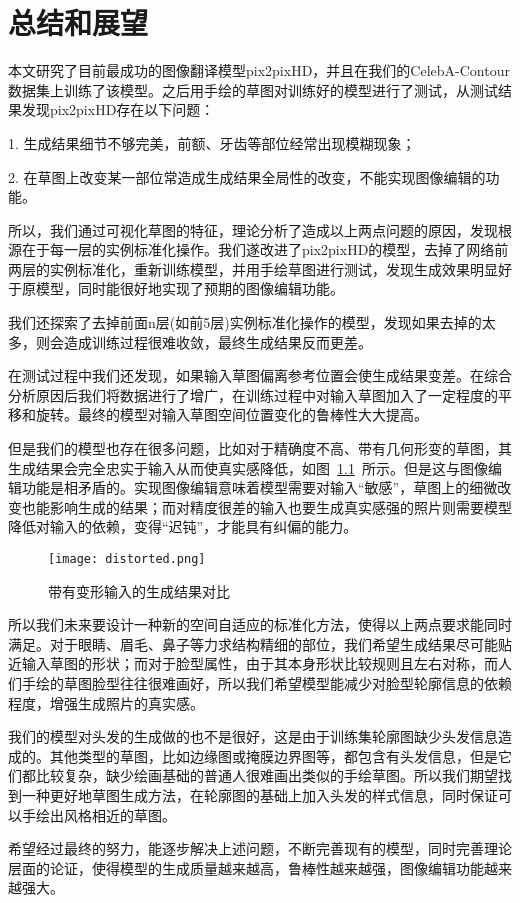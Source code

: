 
\chapter{总结和展望}

本文研究了目前最成功的图像翻译模型pix2pixHD\cite{pix2pixhd}，并且在我们的CelebA-Contour数据集上训练了该模型。之后用手绘的草图对训练好的模型进行了测试，从测试结果发现pix2pixHD存在以下问题：

1. 生成结果细节不够完美，前额、牙齿等部位经常出现模糊现象；

2. 在草图上改变某一部位常造成生成结果全局性的改变，不能实现图像编辑的功能。

所以，我们通过可视化草图的特征，理论分析了造成以上两点问题的原因，发现根源在于每一层的实例标准化操作。我们遂改进了pix2pixHD的模型，去掉了网络前两层的实例标准化，重新训练模型，并用手绘草图进行测试，发现生成效果明显好于原模型，同时能很好地实现了预期的图像编辑功能。

我们还探索了去掉前面n层(如前5层)实例标准化操作的模型，发现如果去掉的太多，则会造成训练过程很难收敛，最终生成结果反而更差。

在测试过程中我们还发现，如果输入草图偏离参考位置会使生成结果变差。在综合分析原因后我们将数据进行了增广，在训练过程中对输入草图加入了一定程度的平移和旋转。最终的模型对输入草图空间位置变化的鲁棒性大大提高。

但是我们的模型也存在很多问题，比如对于精确度不高、带有几何形变的草图，其生成结果会完全忠实于输入从而使真实感降低，如图~\ref{fig:distorted}~所示。但是这与图像编辑功能是相矛盾的。实现图像编辑意味着模型需要对输入“敏感”，草图上的细微改变也能影响生成的结果；而对精度很差的输入也要生成真实感强的照片则需要模型降低对输入的依赖，变得“迟钝”，才能具有纠偏的能力。
\begin{figure}[htb]
	\centering
	\texttt{[image: distorted.png]}
	\caption{带有变形输入的生成结果对比}
	\label{fig:distorted}
\end{figure}

所以我们未来要设计一种新的空间自适应的标准化方法，使得以上两点要求能同时满足。对于眼睛、眉毛、鼻子等力求结构精细的部位，我们希望生成结果尽可能贴近输入草图的形状；而对于脸型属性，由于其本身形状比较规则且左右对称，而人们手绘的草图脸型往往很难画好，所以我们希望模型能减少对脸型轮廓信息的依赖程度，增强生成照片的真实感。

我们的模型对头发的生成做的也不是很好，这是由于训练集轮廓图缺少头发信息造成的。其他类型的草图，比如边缘图或掩膜边界图等，都包含有头发信息，但是它们都比较复杂，缺少绘画基础的普通人很难画出类似的手绘草图。所以我们期望找到一种更好地草图生成方法，在轮廓图的基础上加入头发的样式信息，同时保证可以手绘出风格相近的草图。

希望经过最终的努力，能逐步解决上述问题，不断完善现有的模型，同时完善理论层面的论证，使得模型的生成质量越来越高，鲁棒性越来越强，图像编辑功能越来越强大。

